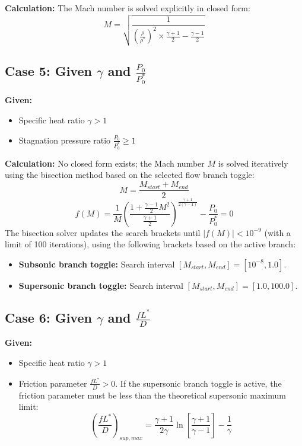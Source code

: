 \textbf{Calculation:} The Mach number is solved explicitly in closed form:
\begin{equation}
M = \sqrt{\frac{1}{\left(\frac{\rho}{\rho^*}\right)^2\times\frac{\gamma+1}{2}-\frac{\gamma-1}{2}}}
\end{equation}


\subsection*{Case 5: Given $\gamma$ and $\frac{P_0}{P_0^*}$}

\textbf{Given:}
\begin{itemize}[nosep]
    \item Specific heat ratio $\gamma > 1$
    \item Stagnation pressure ratio $\frac{P_0}{P_0^*} \ge 1$
\end{itemize}

\textbf{Calculation:} No closed form exists; the Mach number $M$ is solved iteratively using the bisection method based on the selected flow branch toggle:
\begin{equation}
M = \frac{M_{start}+M_{end}}{2}
\end{equation}
\begin{equation}
f(M) = \frac{1}{M}\left(\frac{1+\frac{\gamma-1}{2}M^2}{\frac{\gamma+1}{2}}\right)^{\frac{\gamma+1}{2(\gamma-1)}} - \frac{P_0}{P_0^*} = 0
\end{equation}
The bisection solver updates the search brackets until $|f(M)| < 10^{-9}$ (with a limit of 100 iterations), using the following brackets based on the active branch:
\begin{itemize}[nosep]
    \item \textbf{Subsonic branch toggle:} Search interval $[M_{start}, M_{end}] = [10^{-8}, 1.0]$.
    \item \textbf{Supersonic branch toggle:} Search interval $[M_{start}, M_{end}] = [1.0, 100.0]$.
\end{itemize}


\subsection*{Case 6: Given $\gamma$ and $\frac{f L^*}{D}$}

\textbf{Given:}
\begin{itemize}[nosep]
    \item Specific heat ratio $\gamma > 1$
    \item Friction parameter $\frac{f L^*}{D} > 0$. If the supersonic branch toggle is active, the friction parameter must be less than the theoretical supersonic maximum limit:
    \begin{equation}
    \left(\frac{f L^*}{D}\right)_{sup,max} = \frac{\gamma+1}{2\gamma}\ln\left[\frac{\gamma+1}{\gamma-1}\right] - \frac{1}{\gamma}
    \end{equation}
\end{itemize}

